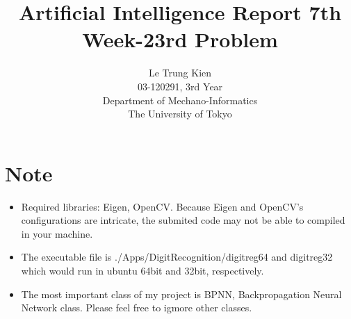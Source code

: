 \documentclass[a4paper, 11pt]{article}
\begin{document}
\title{Artificial Intelligence Report 7th Week-23rd Problem}
\author{Le Trung Kien\\ 
  03-120291, 3rd Year \\
  Department of Mechano-Informatics \\ 
  The University of Tokyo
}
\maketitle
\section*{Note}
\begin{itemize}
\item Required libraries: Eigen, OpenCV. Because Eigen and OpenCV's configurations are intricate, the submited code may not be able to compiled in your machine.
\item The executable file is ./Apps/DigitRecognition/digitreg64 and digitreg32 which would run in ubuntu 64bit and 32bit, respectively.
\item The most important class of my project is BPNN, Backpropagation Neural Network class. Please feel free to igmore other classes.
\end{itemize}
\newpage
\end{document}
